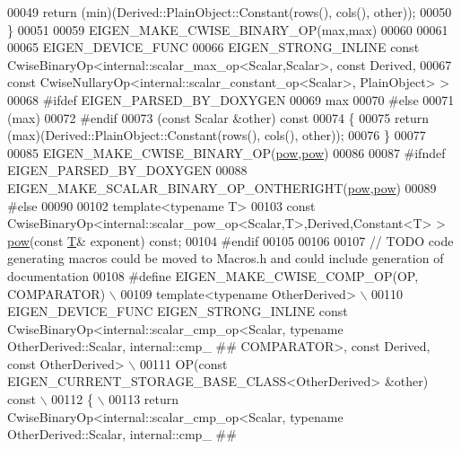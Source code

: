 \begin{DoxyCode}
00049   \textcolor{keywordflow}{return} (min)(Derived::PlainObject::Constant(rows(), cols(), other));
00050 \}
00051 
00059 EIGEN\_MAKE\_CWISE\_BINARY\_OP(max,max)
00060 
00061 
00065 EIGEN\_DEVICE\_FUNC
00066 EIGEN\_STRONG\_INLINE \textcolor{keyword}{const} CwiseBinaryOp<internal::scalar\_max\_op<Scalar,Scalar>, \textcolor{keyword}{const} Derived,
00067                                         \textcolor{keyword}{const} CwiseNullaryOp<internal::scalar\_constant\_op<Scalar>, 
      PlainObject> >
00068 \textcolor{preprocessor}{#ifdef EIGEN\_PARSED\_BY\_DOXYGEN}
00069 max
00070 \textcolor{preprocessor}{#else}
00071 (max)
00072 #endif
00073 (\textcolor{keyword}{const} Scalar &other)\textcolor{keyword}{ const}
00074 \textcolor{keyword}{}\{
00075   \textcolor{keywordflow}{return} (max)(Derived::PlainObject::Constant(rows(), cols(), other));
00076 \}
00077 
00085 EIGEN\_MAKE\_CWISE\_BINARY\_OP(\hyperlink{group___core___module_ab6dc101d82e8228a19a8840e3a29c1c9}{pow},\hyperlink{group___core___module_ab6dc101d82e8228a19a8840e3a29c1c9}{pow})
00086 
00087 \textcolor{preprocessor}{#ifndef EIGEN\_PARSED\_BY\_DOXYGEN}
00088 EIGEN\_MAKE\_SCALAR\_BINARY\_OP\_ONTHERIGHT(\hyperlink{group___core___module_ab6dc101d82e8228a19a8840e3a29c1c9}{pow},\hyperlink{group___core___module_ab6dc101d82e8228a19a8840e3a29c1c9}{pow})
00089 \textcolor{preprocessor}{#else}
00090 
00102 \textcolor{keyword}{template}<\textcolor{keyword}{typename} T>
00103 \textcolor{keyword}{const} CwiseBinaryOp<internal::scalar\_pow\_op<Scalar,T>,Derived,Constant<T> > \hyperlink{group___core___module_ab6dc101d82e8228a19a8840e3a29c1c9}{pow}(\textcolor{keyword}{const} 
      \hyperlink{group___sparse_core___module_class_eigen_1_1_triplet}{T}& exponent) \textcolor{keyword}{const};
00104 \textcolor{preprocessor}{#endif}
00105 
00106 
00107 \textcolor{comment}{// TODO code generating macros could be moved to Macros.h and could include generation of documentation}
00108 \textcolor{preprocessor}{#define EIGEN\_MAKE\_CWISE\_COMP\_OP(OP, COMPARATOR) \(\backslash\)}
00109 \textcolor{preprocessor}{template<typename OtherDerived> \(\backslash\)}
00110 \textcolor{preprocessor}{EIGEN\_DEVICE\_FUNC EIGEN\_STRONG\_INLINE const CwiseBinaryOp<internal::scalar\_cmp\_op<Scalar, typename
       OtherDerived::Scalar, internal::cmp\_ ## COMPARATOR>, const Derived, const OtherDerived> \(\backslash\)}
00111 \textcolor{preprocessor}{OP(const EIGEN\_CURRENT\_STORAGE\_BASE\_CLASS<OtherDerived> &other) const \(\backslash\)}
00112 \textcolor{preprocessor}{\{ \(\backslash\)}
00113 \textcolor{preprocessor}{  return CwiseBinaryOp<internal::scalar\_cmp\_op<Scalar, typename OtherDerived::Scalar, internal::cmp\_ ##
}
\end{DoxyCode}
